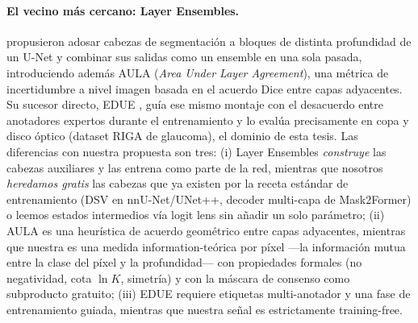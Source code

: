 \documentclass[12pt,a4paper]{article}
\begin{document}
\paragraph{El vecino más cercano: Layer Ensembles.}
\citet{kushibar2022layer} propusieron adosar cabezas de segmentación a bloques de distinta profundidad de un U-Net y combinar sus salidas como un ensemble en una sola pasada, introduciendo además AULA (\textit{Area Under Layer Agreement}), una métrica de incertidumbre a nivel imagen basada en el acuerdo Dice entre capas adyacentes.
Su sucesor directo, EDUE \citep{abutalip2024edue}, guía ese mismo montaje con el desacuerdo entre anotadores expertos durante el entrenamiento y lo evalúa precisamente en copa y disco óptico (dataset RIGA de glaucoma), el dominio de esta tesis.
Las diferencias con nuestra propuesta son tres: (i) Layer Ensembles \emph{construye} las cabezas auxiliares y las entrena como parte de la red, mientras que nosotros \emph{heredamos gratis} las cabezas que ya existen por la receta estándar de entrenamiento (DSV en nnU-Net/UNet++, decoder multi-capa de Mask2Former) o leemos estados intermedios vía logit lens sin añadir un solo parámetro; (ii) AULA es una heurística de acuerdo geométrico entre capas adyacentes, mientras que nuestra  es una medida information-teórica por píxel ---la información mutua entre la clase del píxel y la profundidad--- con propiedades formales (no negatividad, cota $\ln K$, simetría) y con la máscara de consenso como subproducto gratuito; (iii) EDUE requiere etiquetas multi-anotador y una fase de entrenamiento guiada, mientras que nuestra señal es estrictamente training-free.
\end{document}
